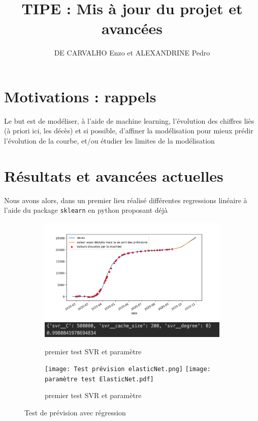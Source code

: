 \documentclass[a4paper,11pt]{article}
\title{TIPE : Mis à jour du projet et avancées}
\author{DE CARVALHO Enzo et ALEXANDRINE Pedro}
\begin{document}
\maketitle
\section{Motivations : rappels}
	Le but est de modéliser, à l'aide de machine learning, l'évolution des 
	chiffres liès (à priori ici, les décès) et si possible, d'affiner la 			modélisation pour mieux prédir l'évolution de la courbe, et/ou étudier 			les limites de la modélisation

\section{Résultats et avancées actuelles}
	Nous avons alors, dans un premier lieu réalisé différentes regressions
	linéaire à l'aide du package \texttt{sklearn} en python proposant déjà
	

\begin{figure}[h!]
  \centering
  \begin{subfigure}[b]{0.5\linewidth}
    \includegraphics[width=\linewidth]{deces_covid_machinelearning1.png}
   \includegraphics[width=\linewidth]{params1.png}
    \caption{premier test SVR et paramètre }
     \end{subfigure}
  \begin{subfigure}[b]{0.5\linewidth}
    \texttt{[image: Test prévision elasticNet.png]}
   \texttt{[image: paramètre test ElasticNet.pdf]}
    \caption{premier test SVR et paramètre }
  \end{subfigure}
  \caption{Test de prévision avec régression}
  \label{fig:coffee}
\end{figure}








	
\end{document}

